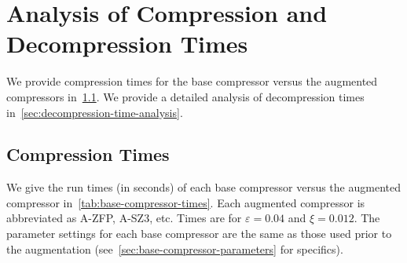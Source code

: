 \section{Analysis of Compression and Decompression Times}
\label{sec:more-running-time}

We provide compression times for the base compressor versus the augmented compressors in~\cref{sec:base-compressor-times}. We provide a detailed analysis of decompression times in~\cref{sec:decompression-time-analysis}.

\subsection{Compression Times}
\label{sec:base-compressor-times}

We give the run times (in seconds) of each base compressor versus the augmented compressor in~\cref{tab:base-compressor-times}. Each augmented compressor is abbreviated as A-ZFP, A-SZ3, etc. 
Times are for $\varepsilon = 0.04$ and $\xi = 0.012$. The parameter settings for each base compressor are the same as those used prior to the augmentation (see~\cref{sec:base-compressor-parameters} for specifics).

